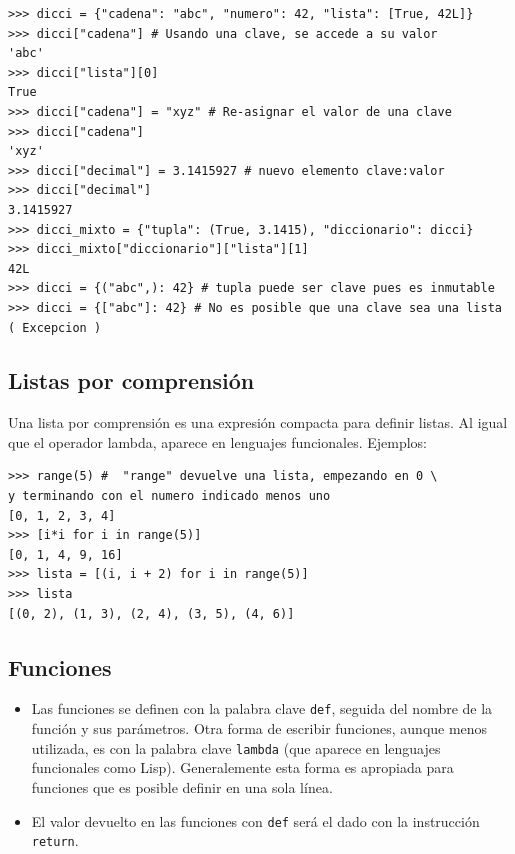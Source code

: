 \begin{lstlisting}
>>> dicci = {"cadena": "abc", "numero": 42, "lista": [True, 42L]}
>>> dicci["cadena"] # Usando una clave, se accede a su valor
'abc'
>>> dicci["lista"][0]
True
>>> dicci["cadena"] = "xyz" # Re-asignar el valor de una clave
>>> dicci["cadena"]
'xyz'
>>> dicci["decimal"] = 3.1415927 # nuevo elemento clave:valor
>>> dicci["decimal"]
3.1415927
>>> dicci_mixto = {"tupla": (True, 3.1415), "diccionario": dicci}
>>> dicci_mixto["diccionario"]["lista"][1]
42L
>>> dicci = {("abc",): 42} # tupla puede ser clave pues es inmutable
>>> dicci = {["abc"]: 42} # No es posible que una clave sea una lista
( Excepcion )
\end{lstlisting}



\subsection{Listas por comprensión}
Una lista por comprensión es una expresión compacta para definir listas. Al igual que el operador lambda, aparece en lenguajes funcionales. Ejemplos:


\begin{lstlisting}
>>> range(5) #  "range" devuelve una lista, empezando en 0 \
y terminando con el numero indicado menos uno
[0, 1, 2, 3, 4]
>>> [i*i for i in range(5)]
[0, 1, 4, 9, 16]
>>> lista = [(i, i + 2) for i in range(5)]
>>> lista
[(0, 2), (1, 3), (2, 4), (3, 5), (4, 6)]
\end{lstlisting}



\subsection{Funciones}
\begin{itemize}

  \item  Las funciones se definen con la palabra clave \verb~def~, seguida del nombre de
  la función y sus parámetros. 
  Otra forma de escribir funciones, aunque menos utilizada, es con la palabra clave \verb~lambda~ (que aparece en lenguajes funcionales como Lisp). Generalemente esta forma es apropiada para funciones que es posible definir en una sola línea.
  
  
  \item  El valor devuelto en las funciones con \verb~def~ será el dado con la instrucción \verb~return~.
  \end{itemize}



